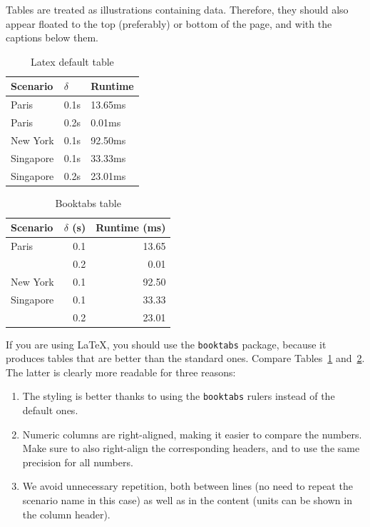 \documentclass{article}
\begin{document}
Tables are treated as illustrations containing data. Therefore, they should also appear floated to the top (preferably) or bottom of the page, and with the captions below them.

\begin{table}
    \centering
    \begin{tabular}{lll}
        \hline
        Scenario  & $\delta$ & Runtime \\
        \hline
        Paris     & 0.1s     & 13.65ms \\
        Paris     & 0.2s     & 0.01ms  \\
        New York  & 0.1s     & 92.50ms \\
        Singapore & 0.1s     & 33.33ms \\
        Singapore & 0.2s     & 23.01ms \\
        \hline
    \end{tabular}
    \caption{Latex default table}
    \label{tab:plain}
\end{table}

\begin{table}
    \centering
    \begin{tabular}{lrr}
        \toprule
        Scenario  & $\delta$ (s) & Runtime (ms) \\
        \midrule
        Paris     & 0.1          & 13.65        \\
                  & 0.2          & 0.01         \\
        New York  & 0.1          & 92.50        \\
        Singapore & 0.1          & 33.33        \\
                  & 0.2          & 23.01        \\
        \bottomrule
    \end{tabular}
    \caption{Booktabs table}
    \label{tab:booktabs}
\end{table}

If you are using \LaTeX, you should use the {\tt booktabs} package, because it produces tables that are better than the standard ones. Compare Tables~\ref{tab:plain} and~\ref{tab:booktabs}. The latter is clearly more readable for three reasons:

\begin{enumerate}
    \item The styling is better thanks to using the {\tt booktabs} rulers instead of the default ones.
    \item Numeric columns are right-aligned, making it easier to compare the numbers. Make sure to also right-align the corresponding headers, and to use the same precision for all numbers.
    \item We avoid unnecessary repetition, both between lines (no need to repeat the scenario name in this case) as well as in the content (units can be shown in the column header).
\end{enumerate}
\end{document}
